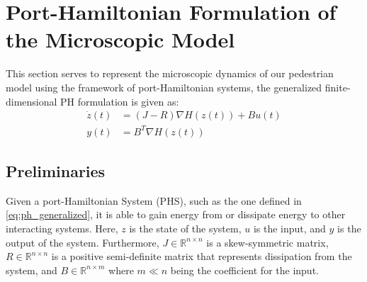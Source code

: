 \section{Port-Hamiltonian Formulation of the Microscopic Model}

This section serves to represent the microscopic dynamics of our pedestrian model using the framework of port-Hamiltonian systems, the generalized finite-dimensional PH formulation is given as:
\begin{equation}
\begin{aligned}
    \dot z(t) &= (J-R)\nabla H(z(t)) + Bu(t) \\
    y(t) &= B^T \nabla H(z(t))
\end{aligned}
\label{eq:ph_generalized}
\end{equation}

\subsection{Preliminaries}
Given a port-Hamiltonian System (PHS), such as the one defined in \autoref{eq:ph_generalized}, it is able to gain energy from or dissipate energy to other interacting systems. Here, $z$ is the state of the system, $u$ is the input, and $y$ is the output of the system. Furthermore, $J \in \mathbb R^{n \times n}$ is a skew-symmetric matrix, $R \in \mathbb R^{n \times n}$ is a positive semi-definite matrix that represents dissipation from the system, and $B \in \mathbb R^{n \times m}$ where $ m \ll n$ being the coefficient for the input.

